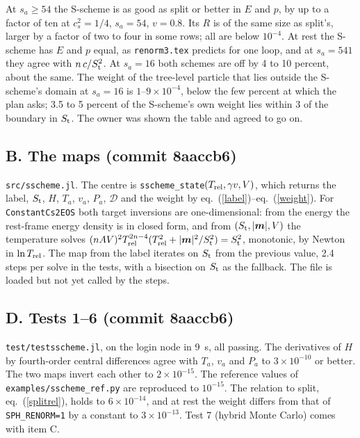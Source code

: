 \documentclass[11pt,aps,preprint,nofootinbib,superscriptaddress,tightenlines]{revtex4-2}
\def\Eq#1{eq.~(\ref{#1})}
\begin{document}
At $s_a\ge54$ the S-scheme is as good as split or better in $E$ and $p$, by up to a factor of ten at $c_s^2=1/4$, $s_a=54$, $v=0.8$.  Its $R$ is of
the same size as split's, larger by a factor of two to four in some rows; all are below $10^{-4}$.  At rest the S-scheme has $E$ and $p$ equal, as
\nolinkurl{renorm3.tex} predicts for one loop, and at $s_a=541$ they agree with $n\,c/S_{\rm t}^2$.  At $s_a=16$ both schemes are off by 4 to 10
percent, about the same.  The weight of the tree-level particle that lies outside the S-scheme's domain at $s_a=16$ is $1$--$9\times10^{-4}$, below
the few percent at which the plan asks; 3.5 to 5 percent of the S-scheme's own weight lies within 3 of the boundary in $S_{\rm t}$.  The owner was
shown the table and agreed to go on.

\subsection*{B. The maps (commit 8aaccb6)}

\nolinkurl{src/sscheme.jl}.  The centre is \texttt{sscheme\_state}$(T_{\rm rel},\gamma v,V)$, which returns the label, $S_{\rm t}$, $H$, $T_a$,
$v_a$, $P_a$, $\mathcal D$ and the weight by \Eq{label}--\Eq{weight}.  For \texttt{ConstantCs2EOS} both target inversions are one-dimensional: from
the energy the rest-frame energy density is in closed form, and from $(S_{\rm t},|\bm m|,V)$ the temperature solves
$(nAV)^2T_{\rm rel}^{2n-4}(T_{\rm rel}^2+|\bm m|^2/S_{\rm t}^2)=S_{\rm t}^2$, monotonic, by Newton in $\ln T_{\rm rel}$.  The map from the label iterates
on $S_{\rm t}$ from the previous value, 2.4 steps per solve in the tests, with a bisection on $S_{\rm t}$ as the fallback.  The file is loaded but not
yet called by the steps.

\subsection*{D. Tests 1--6 (commit 8aaccb6)}

\nolinkurl{test/testsscheme.jl}, on the login node in 9~s, all passing.  The derivatives of $H$ by fourth-order central differences agree with $T_a$,
$v_a$ and $P_a$ to $3\times10^{-10}$ or better.  The two maps invert each other to $2\times10^{-15}$.  The reference values of
\nolinkurl{examples/sscheme_ref.py} are reproduced to $10^{-15}$.  The relation to split, \Eq{splitrel}, holds to $6\times10^{-14}$, and at rest the
weight differs from that of \texttt{SPH\_RENORM=1} by a constant to $3\times10^{-13}$.  Test 7 (hybrid Monte Carlo) comes with item C.
\end{document}
